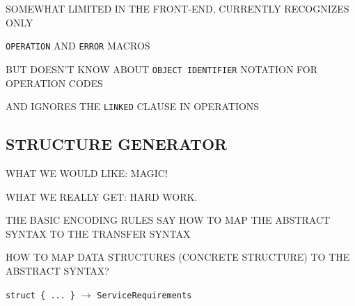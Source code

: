 

\begin{bwslide}

\begin{nrtc}
\item	SOMEWHAT LIMITED IN THE FRONT-END, CURRENTLY RECOGNIZES ONLY
    \begin{nrtc}
    \item	\verb"OPERATION" AND \verb"ERROR" MACROS
    \end{nrtc}

\item	BUT DOESN'T KNOW ABOUT \verb"OBJECT IDENTIFIER" NOTATION FOR OPERATION
	CODES

\item	AND IGNORES THE \verb"LINKED" CLAUSE IN OPERATIONS
\end{nrtc}
\end{bwslide}


\begin{bwslide}
\part*	{STRUCTURE GENERATOR}\bf

\begin{nrtc}
\item	WHAT WE WOULD LIKE: MAGIC!

\item	WHAT WE REALLY GET: HARD WORK.
\end{nrtc}
\end{bwslide}


\begin{bwslide}

\begin{nrtc}
\item	THE BASIC ENCODING RULES SAY HOW TO MAP THE ABSTRACT SYNTAX TO THE
	TRANSFER SYNTAX

\item	HOW TO MAP DATA STRUCTURES (CONCRETE STRUCTURE) TO THE ABSTRACT SYNTAX?
    \begin{nrtc}
    \item	\verb"struct { ... }" $\rightarrow$ \verb"ServiceRequirements"
    \end{nrtc}
\end{nrtc}
\end{bwslide}


